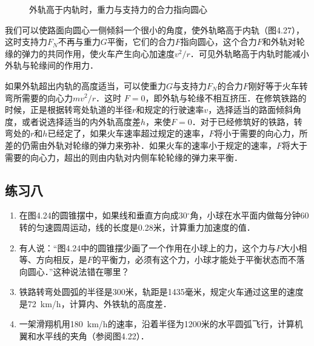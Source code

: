 \begin{figure}[H]
    \caption{外轨高于内轨时，重力与支持力的合力指向圆心}
\end{figure}

我们可以使路面向圆心一侧倾斜一个很小的角度，使外轨略高于内轨（图4.27），这时支持力$F_N$不再与重力$G$平衡，它们的合力$F$指向圆心，这个合力$F$和外轨对轮缘的弹力的共同作用，使火车产生向心加速度$v^2/r$．可见外轨略高于内轨时能减小外轨与轮缘间的作用力．


如果外轨超出内轨的高度适当，可以使重力$G$与支持力$F_N$的合力$F$刚好等于火车转弯所需要的向心力$mv^2/r$．这时
$F=0$，即外轨与轮缘不相互挤压．在修筑铁路的时候，正是根据转弯处轨道的半径$r$和规定的行驶速率$v$，选择适当的路面倾斜角度，或者说选择适当的内外轨高度差$h$，来使$F=0$．对于已经修筑好的铁路，转弯处的$r$和$h$已经定了，如果火车速率超过规定的速率，$F$将小于需要的向心力，所差的仍需由外轨对轮缘的弹力来弥补．如果火车的速率小于规定的速率，$F$将大于需要的向心力，超出的则由内轨对内侧车轮轮缘的弹力来平衡．

\subsection*{练习八}
\begin{enumerate}
    \item 在图4.24的圆锥摆中，如果线和垂直方向成30$^\circ$角，小球在水平面内做每分钟60转的匀速圆周运动，线的长度是0.28米，计算重力加速度的值．
    \item 有人说：“图4.24中的圆锥摆少画了一个作用在小球上的力，这个力与$F$大小相等、方向相反，是$F$的平衡力，必须有这个力，小球才能处于平衡状态而不落向圆心．”这种说法错在哪里？
    \item 铁路转弯处圆弧的半径是300米，轨距是1435毫米，规定火车通过这里的速度是\SI{72}{km/h}，计算内、外铁轨的高度差．
    \item 一架滑翔机用\SI{180}{km/h}的速率，沿着半径为1200米的水平圆弧飞行，计算机翼和水平线的夹角（参阅图4.22）．
\end{enumerate}
\newpage
